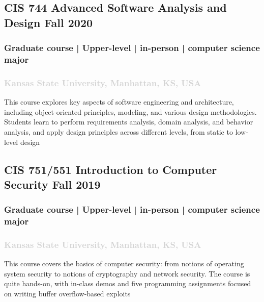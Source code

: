 \documentclass[11pt]{article}
\begin{document}
\label{sec: CIS744} 
   \vspace{0.8em} %
     
   \subsection{ CIS 744 Advanced Software Analysis and Design   \hfill \normalfont Fall 2020 }
       \subsubsection{ Graduate course | Upper-level | in-person | computer science major   }
  \subsubsection{ \normalfont \textcolor{lightgray}{ Kansas State University, Manhattan, KS, USA   }}
     \vspace{0.4em} %
       \noindent This course explores key aspects of software engineering and architecture, including object-oriented principles, modeling, and various design methodologies. Students learn to perform requirements analysis, domain analysis, and behavior analysis, and apply design principles across different levels, from static to low-level design

\label{sec: CIS751/551} 
   \vspace{0.8em} %
  \subsection{ CIS 751/551 Introduction to Computer Security  \hfill \normalfont Fall 2019  }
      \subsubsection{ Graduate course | Upper-level | in-person | computer science major   }
  \subsubsection{ \normalfont \textcolor{lightgray}{Kansas State University, Manhattan, KS, USA   }}
    \vspace{0.4em} %
       \noindent
This course covers the basics of computer security: from notions of operating system security to notions of cryptography and network security. The course is quite hands-on, with in-class demos and five programming assignments focused on writing buffer overflow-based exploits
\end{document}
